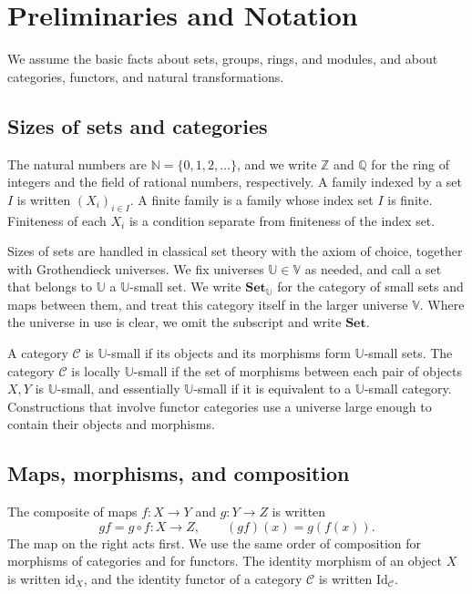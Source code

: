 \chapter*{Preliminaries and Notation}

We assume the basic facts about sets, groups, rings, and modules, and about
categories, functors, and natural transformations.

\section{Sizes of sets and categories}\label{sec:P.1}

The natural numbers are $\mathbb{N}=\{0,1,2,\ldots\}$, and we write
$\mathbb{Z}$ and $\mathbb{Q}$ for the ring of integers and the field of
rational numbers, respectively. A family indexed by a set $I$ is written
$(X_i)_{i\in I}$. A finite family is a family whose index set $I$ is finite.
Finiteness of each $X_i$ is a condition separate from finiteness of the index
set.

Sizes of sets are handled in classical set theory with the axiom of choice,
together with Grothendieck universes. We fix universes
$\mathbb{U}\in\mathbb{V}$ as needed, and call a set that belongs to
$\mathbb{U}$ a $\mathbb{U}$-small set. We write
${\mathbf{Set}}_{\mathbb{U}}$ for the category of small sets and maps between
them, and treat this category itself in the larger universe $\mathbb{V}$. Where the
universe in use is clear, we omit the subscript and write ${\mathbf{Set}}$.

A category $\mathcal{C}$ is $\mathbb{U}$-small if its objects and its
morphisms form $\mathbb{U}$-small sets. The category $\mathcal{C}$ is locally $\mathbb{U}$-small if the set of
morphisms between each pair of objects $X,Y$ is $\mathbb{U}$-small, and
essentially $\mathbb{U}$-small if it is equivalent to a $\mathbb{U}$-small
category. Constructions that involve functor
categories use a universe large enough to contain their objects and
morphisms.

\section{Maps, morphisms, and composition}\label{sec:P.2}

The composite of maps $f:X\to Y$ and $g:Y\to Z$ is written
\[
gf=g\circ f:X\longrightarrow Z,
\qquad (gf)(x)=g(f(x)).
\]
The map on the right acts first. We use the same order of composition for
morphisms of categories and for functors. The identity morphism of an object
$X$ is written $\mathrm{id}_X$, and the identity functor of a category
$\mathcal{C}$ is written $\mathrm{Id}_{\mathcal{C}}$.


